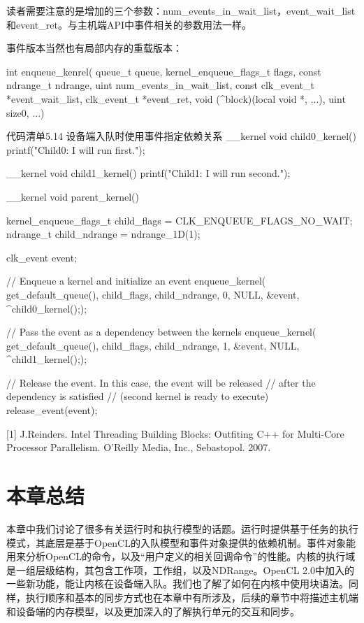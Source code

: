读者需要注意的是增加的三个参数：num\_\allowbreak{}events\_\allowbreak{}in\_\allowbreak{}wait\_\allowbreak{}list，event\_\allowbreak{}wait\_\allowbreak{}list和event\_\allowbreak{}ret。与主机端API中事件相关的参数用法一样。

事件版本当然也有局部内存的重载版本：

\begin{codebox}[cpp]
int
enqueue_kenrel(
  queue_t queue,
  kernel_enqueue_flags_t flags,
  const ndrange_t ndrange,
  uint num_events_in_wait_list,
  const clk_event_t *event_wait_list,
  clk_event_t *event_ret,
  void (^block)(local void *, ...),
  uint size0, ...)
\end{codebox}

\begin{codeboxt}[cpp]{代码清单5.14 设备端入队时使用事件指定依赖关系}
__kernel
void child0_kernel(){
  printf("Child0: I will run first.\n");
}

__kernel
void child1_kernel(){
  printf("Child1: I will run second.\n");
}

__kernel
void parent_kernel(){
  kernel_enqueue_flags_t child_flags = CLK_ENQUEUE_FLAGS_NO_WAIT;
  ndrange_t child_ndrange = ndrange_1D(1);

  clk_event event;

  // Enqueue a kernel and initialize an event
  enqueue_kernel(
    get_default_queue(),
    child_flags,
    child_ndrange,
    0,
    NULL,
    &event,
    ^{child0_kernel();});

  // Pass the event as a dependency between the kernels
  enqueue_kernel(
    get_default_queue(),
    child_flags,
    child_ndrange,
    1,
    &event,
    NULL,
    ^{child1_kernel();});

  // Release the event. In this case, the event will be released
  // after the dependency is satisfied
  // (second kernel is ready to execute)
  release_event(event);
}
\end{codeboxt}

\myRefRule

\begin{myRefs}

[1] J.Reinders. Intel Threading Building Blocks: Outfiting C++ for Multi-Core Processor Parallelism. O'Reilly Media, Inc., Sebastopol. 2007.

\end{myRefs}



\section{本章总结}

本章中我们讨论了很多有关运行时和执行模型的话题。运行时提供基于任务的执行模式，其底层是基于OpenCL的入队模型和事件对象提供的依赖机制。事件对象能用来分析OpenCL的命令，以及“用户定义的相关回调命令”的性能。内核的执行域是一组层级结构，其包含工作项，工作组，以及NDRange。OpenCL 2.0中加入的一些新功能，能让内核在设备端入队。我们也了解了如何在内核中使用块语法。同样，执行顺序和基本的同步方式也在本章中有所涉及，后续的章节中将描述主机端和设备端的内存模型，以及更加深入的了解执行单元的交互和同步。


